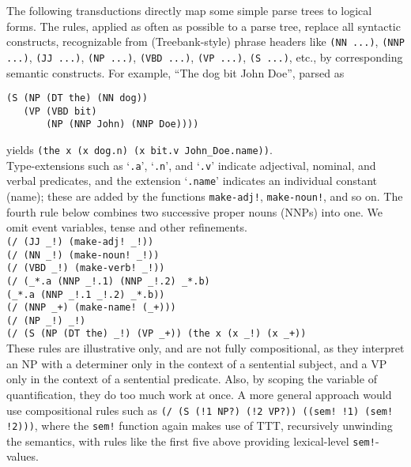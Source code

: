 \documentclass[a4,11pt]{article}
\begin{document}
The following transductions directly map some simple parse trees to logical forms. The rules, applied as often as possible to a parse tree, replace all syntactic constructs, recognizable from (Treebank-style) phrase headers like \texttt{(NN ...)}, \texttt{(NNP ...)}, \texttt{(JJ ...)}, \texttt{(NP ...)}, \texttt{(VBD ...)}, \texttt{(VP ...)}, \texttt{(S ...)}, etc., by corresponding semantic constructs.  For example, ``The dog bit John Doe'', parsed as 
\small
\begin{verbatim}
(S (NP (DT the) (NN dog)) 
   (VP (VBD bit) 
       (NP (NNP John) (NNP Doe))))
\end{verbatim}
\normalsize
 yields 
\texttt{(the x (x dog.n) (x bit.v John\_Doe.name))}.\\
Type-extensions such as `\texttt{.a}', `\texttt{.n}', and `\texttt{.v}' indicate adjectival, nominal, and verbal predicates, and the extension `\texttt{.name}' indicates an individual constant (name); these are added by the functions \texttt{make-adj!}, \texttt{make-noun!}, and so on. The fourth rule below combines two successive proper nouns (NNPs) into one. We omit event variables, tense and other refinements.\\
\small
\texttt{(/ (JJ \_!) (make-adj! \_!))}\\
\texttt{(/ (NN \_!) (make-noun! \_!))}\\
\texttt{(/ (VBD \_!) (make-verb! \_!))}\\
\texttt{(/ (\_*.a (NNP \_!.1) (NNP \_!.2) \_*.b)}\\
\hspace*{3em}\texttt{(\_*.a (NNP \_!.1 \_!.2) \_*.b))}\\
\texttt{(/ (NNP \_+) (make-name! (\_+)))}\\
\texttt{(/ (NP \_!) \_!)}\\
\texttt{(/ (S (NP (DT the) \_!) (VP \_+)) (the x (x \_!) (x \_+))}\\
\normalsize
These rules are illustrative only, and are not fully compositional, as they interpret an NP with a determiner only in the context of a sentential subject, and a VP only in the context of a sentential predicate. Also, by scoping the variable of quantification, they do too much work at once. A more general approach would use compositional rules such as \texttt{(/ (S (!1 NP?) (!2 VP?)) ((sem! !1) (sem! !2)))}, where the \texttt{sem!} function again makes use of TTT, recursively unwinding the semantics, with rules like the first five above providing lexical-level \texttt{sem!}-values.
\end{document}

